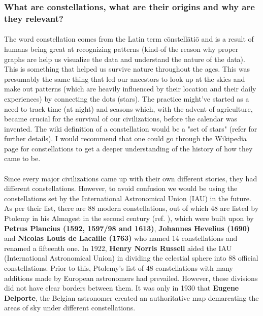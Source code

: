 \documentclass[a4paper,twoside]{article}
\numberwithin{equation}{section}
\begin{document}
\subsubsection{What are constellations, what are their origins and why are they relevant?}
\paragraph{}The word constellation comes from the Latin term cōnstellātiō  and is a result of humans being great at recognizing patterns (kind-of the reason why proper graphs are help us visualize the data and understand the nature of the data). This is something that helped us survive nature throughout the ages. This was presumably the same thing that led our ancestors to look up at the skies and make out patterns (which are heavily influenced by their location and their daily experiences) by connecting the dots (stars). The practice might've started as a need to track time (at night) and seasons which, with the advent of agriculture, became crucial for the survival of our civilizations, before the calendar was invented. The wiki definition of a constellation would be a "set of stars" (refer \cite{wiki_constellation} for further details). I would recommend that one could go through the Wikipedia page for constellations to get a deeper understanding of the history of how they came to be. 
\paragraph{}
Since every major civilizations came up with their own different stories, they had different constellations. However, to avoid confusion we would be using the constellations set by the International Astronomical Union (IAU) in the future. As per their list, there are 88 modern constellations, out of which 48 are listed by Ptolemy in his Almagest in the second century (ref. \cite{wiki_constellation}), which were built upon by \textbf{Petrus Plancius (1592, 1597/98 and 1613)}, \textbf{Johannes Hevelius (1690)} and \textbf{Nicolas Louis de Lacaille (1763)} who named 14 constellations and renamed a fifteenth one. In 1922, \textbf{Henry Norris Russell} aided the IAU (International Astronomical Union) in dividing the celestial sphere into 88 official constellations. Prior to this, Ptolemy's list of 48 constellations with many additions made by European astronomers had prevailed. However, these divisions did not have clear borders between them. It was only in 1930 that \textbf{Eugene Delporte}, the Belgian astronomer created an authoritative map demarcating the areas of sky under different constellations.
\end{document}

